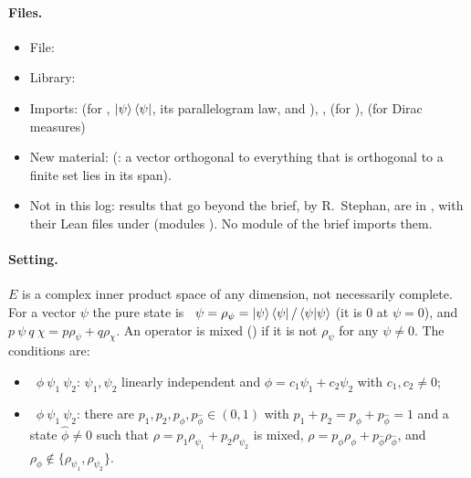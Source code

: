 \documentclass[11pt]{article}
\begin{document}
\paragraph{Files.}\leavevmode
\begin{itemize}
\item File:\newline
\item Library: 
\item Imports:  (for ,
  $\ket\psi\bra\psi$, its parallelogram law, and ),\newline
  ,\newline
   (for ),\newline
   (for Dirac measures)
\item New  material:\newline
  (: a vector orthogonal to everything that is
  orthogonal to a finite set lies in its span).
\item Not in this log: results that go beyond the brief, by R.~Stephan, are in
  , with their Lean files under
  (modules ). No module of the brief
  imports them.
\end{itemize}

\paragraph{Setting.} $E$ is a complex inner product space of any dimension, not necessarily
complete. For a vector $\psi$ the pure state is ~$\psi = \rho_\psi =
\ket\psi\bra\psi/\braket{\psi|\psi}$ (it is $0$ at $\psi = 0$), and ~$p\ \psi\ q\
\chi = p\rho_\psi + q\rho_\chi$. An operator is mixed () if it is not
$\rho_\psi$ for any $\psi \ne 0$. The conditions are:
\begin{itemize}
\item {}~$\phi\ \psi_1\ \psi_2$: $\psi_1, \psi_2$ linearly independent and
  $\phi = c_1\psi_1 + c_2\psi_2$ with $c_1, c_2 \ne 0$;
\item {}~$\phi\ \psi_1\ \psi_2$: there are $p_1, p_2, p_\phi, p_{\hat\phi} \in (0,1)$
  with $p_1 + p_2 = p_\phi + p_{\hat\phi} = 1$ and a state $\hat\phi \ne 0$ such that
  $\rho = p_1\rho_{\psi_1} + p_2\rho_{\psi_2}$ is mixed, $\rho = p_\phi\rho_\phi +
  p_{\hat\phi}\rho_{\hat\phi}$, and $\rho_\phi \notin \{\rho_{\psi_1}, \rho_{\psi_2}\}$.
\end{itemize}
\end{document}
